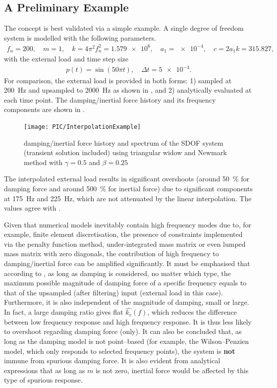 \subsection{A Preliminary Example}\label{sec:sdof_example}
The concept is best validated via a simple example. A single degree of freedom system is modelled with the following parameters.
\begin{gather}
f_n=200,\quad{}m=1,\quad{}k=4\pi^2f_n^2=\num{1.579e6},\quad{}a_1=\num{e-4},\quad{}c=2a_1k=\num{315.827},
\end{gather}
with the external load and time step size
\begin{gather}
p\left(t\right)=\sin\left(50\pi{}t\right),\quad\Delta{}t=\num{5e-4}.
\end{gather}
For comparison, the external load is provided in both forms: 1) sampled at \SI{200}{\hertz} and upsampled to \SI{2000}{\hertz} as shown in , and 2) analytically evaluated at each time point. The damping/inertial force history and its frequency components are shown in .
\begin{figure}[htb!]
\centering
\texttt{[image: PIC/InterpolationExample]}
\caption{damping/inertial force history and spectrum of the SDOF system (transient solution included) using triangular widow and Newmark method with $\gamma=0.5$ and $\beta=0.25$}\label{fig:sdof_force}
\end{figure}
The interpolated external load results in significant overshoots (around \SI{50}{\percent} for damping force and around \SI{500}{\percent} for inertial force) due to significant components at \SI{175}{\hertz} and \SI{225}{\hertz}, which are not attenuated by the linear interpolation. The values agree with .

Given that numerical models inevitably contain high frequency modes due to, for example, finite element discretisation, the presence of constraints implemented via the penalty function method, under-integrated mass matrix or even lumped mass matrix with zero diagonals, the contribution of high frequency to damping/inertial force can be amplified significantly. It must be emphasised that according to , as long as damping is considered, no matter which type, the maximum possible magnitude of damping force of a specific frequency equals to that of the upsampled (after filtering) input (external load in this case). Furthermore, it is also independent of the magnitude of damping, small or large. In fact, a large damping ratio gives flat $\hat{k_v}\left(f\right)$, which reduces the difference between low frequency response and high frequency response. It is thus less likely to overshoot regarding damping force (only). It can also be concluded that, as long as the damping model is not point--based (for example, the Wilson--Penzien model, which only responds to selected frequency points), the system is \textbf{not} immune from spurious damping force. It is also evident from analytical expressions that as long as $m$ is not zero, inertial force would be affected by this type of spurious response.

